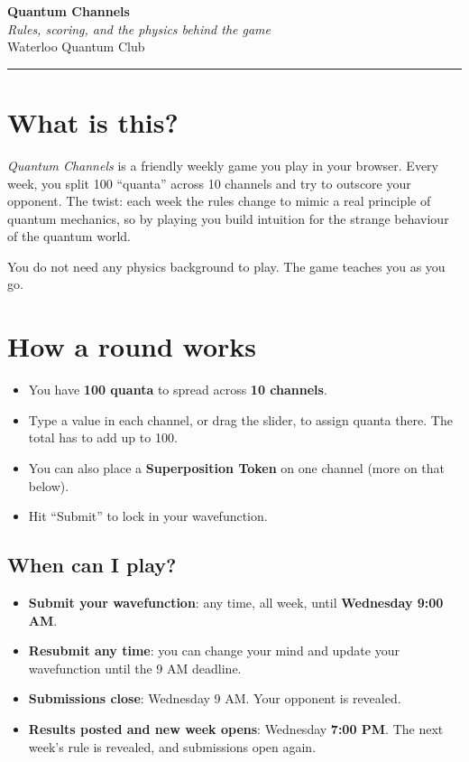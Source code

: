\documentclass[11pt]{article}
\begin{document}
\begin{center}
    {\LARGE\bfseries Quantum Channels}\\[4pt]
    {\large\itshape Rules, scoring, and the physics behind the game}\\[6pt]
    Waterloo Quantum Club
\end{center}

\vspace{0.6em}
\hrule
\vspace{1em}

\section{What is this?}

\emph{Quantum Channels} is a friendly weekly game you play in your browser.
Every week, you split 100 ``quanta'' across 10 channels and try to outscore
your opponent. The twist: each week the rules change to mimic a real principle
of quantum mechanics, so by playing you build intuition for the strange
behaviour of the quantum world.

You do not need any physics background to play. The game teaches you as you go.

\section{How a round works}

\begin{itemize}[leftmargin=1.5em, itemsep=4pt]
    \item You have \textbf{100 quanta} to spread across \textbf{10 channels}.
    \item Type a value in each channel, or drag the slider, to assign quanta there. The total has to add up to 100.
    \item You can also place a \textbf{Superposition Token} on one channel (more on that below).
    \item Hit ``Submit'' to lock in your wavefunction.
\end{itemize}

\subsection*{When can I play?}

\begin{itemize}[leftmargin=1.5em, itemsep=2pt]
    \item \textbf{Submit your wavefunction}: any time, all week, until \textbf{Wednesday 9:00 AM}.
    \item \textbf{Resubmit any time}: you can change your mind and update your
          wavefunction until the 9 AM deadline.
    \item \textbf{Submissions close}: Wednesday 9 AM. Your opponent is revealed.
    \item \textbf{Results posted and new week opens}: Wednesday \textbf{7:00 PM}.
          The next week's rule is revealed, and submissions open again.
\end{itemize}
\end{document}
